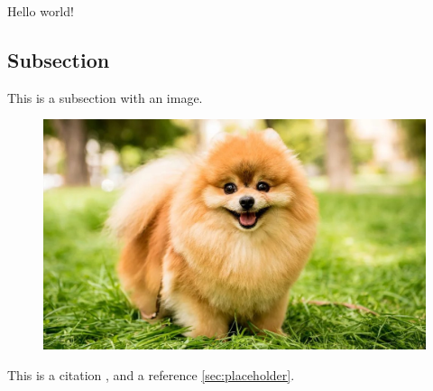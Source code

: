 \documentclass[../main.tex]{subfiles}
\begin{document}
    Hello world!

    \subsection{Subsection}
    \label{subsec:subsection}

    This is a subsection with an image.

    \begin{figure}
        \centering
        \includegraphics[width=\textwidth]{images/dog.jpg}
        \label{fig:figure}
    \end{figure}

    This is a citation \cite{faraway2018small}, and a reference \ref{sec:placeholder}.
\end{document}
